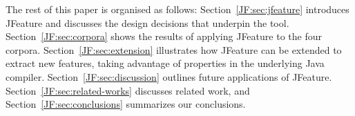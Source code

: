 The rest of this paper is organised as follows:
Section~\ref{JF:sec:jfeature} introduces JFeature and discusses the design decisions that underpin the tool.
Section~\ref{JF:sec:corpora} shows the results of applying JFeature to the four corpora.
Section~\ref{JF:sec:extension} illustrates how JFeature can be extended to extract new features, taking advantage of properties in the underlying Java compiler.
Section~\ref{JF:sec:discussion} outlines future applications of JFeature.
Section~\ref{JF:sec:related-works} discusses related work, and
Section~\ref{JF:sec:conclusions} summarizes our conclusions.
